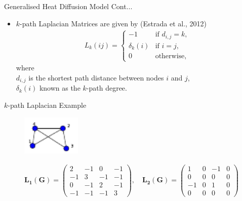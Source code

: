 \documentclass{beamer}
\begin{document}
\begin{frame}{Generalised Heat Diffusion Model Cont... }
\begin{itemize}
	\item $k$-path Laplacian Matrices are given by (Estrada et al., 2012)
	\begin{eqnarray}
	L_k(ij) = \begin{cases} -1 &\mbox{if } d_{i,j} = k, \\
	\delta_k(i) &\mbox{if } i = j,  \\
	0 & \text{otherwise},
	\end{cases}
	\end{eqnarray}\label{k-laplacian}
	where \\
	$d_{i,j}$ is the shortest path distance between nodes $i$ and $j$, \\
	$\delta_{k}(i)$ known as the $k$-path degree.
\end{itemize}
\end{frame}
\begin{frame}{$k$-path Laplacian Example}
	\begin{figure}[H]
		\centering
		\includegraphics[width=0.25\textwidth]{images/compute-spanning.pdf}
		\label{spanning}
	\end{figure}
	
	\begin{eqnarray*}
		\mathbf{L_1(G)} = \begin{pmatrix}
			2 & -1 & 0 & -1 \\
			-1 & 3 & -1 & -1 \\
			0 & -1 & 2 & -1  \\
			-1 & -1 & -1 & 3
		\end{pmatrix}, \quad
		\mathbf{L_2(G)} = \begin{pmatrix}
			1 & 0 & -1 & 0 \\
			0 & 0 & 0 & 0 \\
			-1 & 0 & 1 & 0 \\
			0 & 0 & 0 & 0
		\end{pmatrix}
	\end{eqnarray*}
\end{frame}
\end{document}

